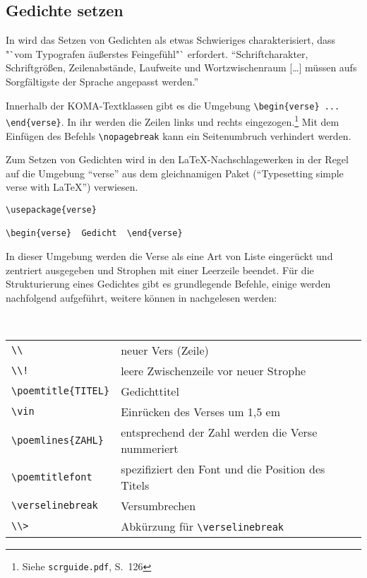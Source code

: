 \subsection{Gedichte setzen}

In \cite[S.\,94]{lesetypografie2010} wird das Setzen von Gedichten als etwas Schwieriges
charakterisiert, dass "`vom Typografen äußerstes Feingefühl"` erfordert. "`Schriftcharakter, Schriftgrößen, Zeilenabstände, Laufweite und Wortzwischenraum [\ldots] müssen aufs Sorgfältigste der Sprache angepasst werden."'

Innerhalb der KOMA-Textklassen gibt es die Umgebung \verb|\begin{verse} ... \end{verse}|.
In ihr werden die Zeilen links und rechts eingezogen.\footnote{Siehe \texttt{scrguide.pdf},
S.~126}
Mit dem Einfügen des Befehls \verb|\nopagebreak| kann ein Seitenumbruch verhindert werden. 

Zum Setzen von Gedichten wird in den \LaTeX -Nachschlagewerken in der Regel
auf die Umgebung "`verse"' aus dem gleichnamigen  Paket ("`Typesetting simple 
verse with \LaTeX "') verwiesen. 

\begin{lstlisting}
\usepackage{verse}

\begin{verse}  Gedicht  \end{verse}
\end{lstlisting}

In dieser Umgebung werden die Verse als eine Art von Liste eingerückt und zentriert
ausgegeben und Strophen mit einer Leerzeile beendet. Für die
Strukturierung eines Gedichtes gibt es grundlegende Befehle, einige werden
nachfolgend aufgeführt, weitere können in \cite[S.\,5\,f.]{wilson:lyrik} nachgelesen
werden:

~\\
\begin{tabular}{ll}
\verb|\\| & neuer Vers (Zeile) \\
\verb|\\!|& leere Zwischenzeile vor neuer Strophe \\
\verb|\poemtitle{TITEL}| & Gedichttitel \\
\verb|\vin| & Einrücken des Verses um 1,5 em \\
\verb|\poemlines{ZAHL}| & entsprechend der Zahl werden die Verse nummeriert\\
\verb|\poemtitlefont| & spezifiziert den Font und die Position des Titels\\
\verb|\verselinebreak| & Versumbrechen \\
\verb|\\>| & Abkürzung für \verb|\verselinebreak|\\
\end{tabular}

